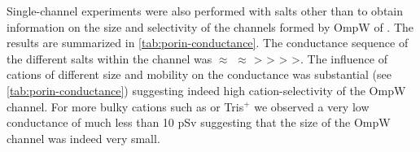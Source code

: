 Single-channel experiments were also performed with salts other than  to obtain information on the size and selectivity of the channels formed by OmpW of \caulobacter. The results are summarized in \cref{tab:porin-conductance}. The conductance sequence of the different salts within the channel was  $\approx$  $\approx$  \textgreater {} \textgreater {} \textgreater {} \textgreater {}. The influence of cations of different size and mobility on the conductance was substantial (see \cref{tab:porin-conductance}) suggesting indeed high cation-selectivity of the OmpW channel. For more bulky cations such as  or Tris$^+$ we observed a very low conductance of much less than 10 \si{\pico\sievert} suggesting that the size of the OmpW channel was indeed very small. 

